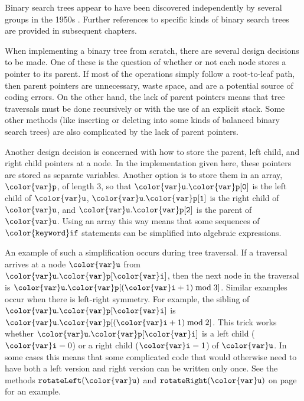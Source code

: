 \documentclass[10pt]{book}
\theoremstyle{plain}
\theoremstyle{definition}
\begin{document}
Binary search trees appear to have been discovered independently by
several groups in the 1950s \cite[Section~6.2.2]{k97v3}.  Further
references to specific kinds of binary search trees are provided in
subsequent chapters.

When implementing a binary tree from scratch, there are several design
decisions to be made.  One of these is the question of whether or not
each node stores a pointer to its parent.  If most of the operations
simply follow a root-to-leaf path, then parent pointers are unnecessary,
waste space, and are a potential source of coding errors.  On the other
hand, the lack of parent pointers means that tree traversals must be done
recursively or with the use of an explicit stack.  Some other methods
(like inserting or deleting into some kinds of balanced binary search
trees) are also complicated by the lack of parent pointers.

Another design decision is concerned with how to store the parent, left
child, and right child pointers at a node.  In the implementation given
here, these pointers are stored as separate variables.   Another option
is to store them in an array, \ensuremath{\mathtt{{\color{var}p}}}, of length 3, so that \ensuremath{\mathtt{{\color{var}u}.{\color{var}p}[0]}} is the
left child of \ensuremath{\mathtt{{\color{var}u}}}, \ensuremath{\mathtt{{\color{var}u}.{\color{var}p}[1]}} is the right child of \ensuremath{\mathtt{{\color{var}u}}}, and \ensuremath{\mathtt{{\color{var}u}.{\color{var}p}[2]}} is
the parent of \ensuremath{\mathtt{{\color{var}u}}}.  Using an array this way means that some sequences
of \ensuremath{\mathtt{{\color{keyword}if}}} statements can be simplified into algebraic expressions.

An example of such a simplification occurs during tree traversal. If
a traversal arrives at a node \ensuremath{\mathtt{{\color{var}u}}} from \ensuremath{\mathtt{{\color{var}u}.{\color{var}p}[{\color{var}i}]}}, then the next node in
the traversal is $\ensuremath{\mathtt{{\color{var}u}.{\color{var}p}}}[(\ensuremath{\mathtt{{\color{var}i}}}+1)\bmod 3]$.  Similar examples occur when
there is left-right symmetry.  For example, the sibling of \ensuremath{\mathtt{{\color{var}u}.{\color{var}p}[{\color{var}i}]}} is
$\ensuremath{\mathtt{{\color{var}u}.{\color{var}p}}}[(\ensuremath{\mathtt{{\color{var}i}}}+1)\bmod 2]$.  This trick works whether \ensuremath{\mathtt{{\color{var}u}.{\color{var}p}[{\color{var}i}]}} is a left
child ($\ensuremath{\mathtt{{\color{var}i}}}=0$) or a right child ($\ensuremath{\mathtt{{\color{var}i}}}=1$) of \ensuremath{\mathtt{{\color{var}u}}}.  In some cases this
means that some complicated code that would otherwise need to have both a
left version and right version can be written only once. See the methods
\ensuremath{\mathtt{rotateLeft({\color{var}u})}} and \ensuremath{\mathtt{rotateRight({\color{var}u})}} on page~\pageref{page:rotations}
for an example.
\end{document}
